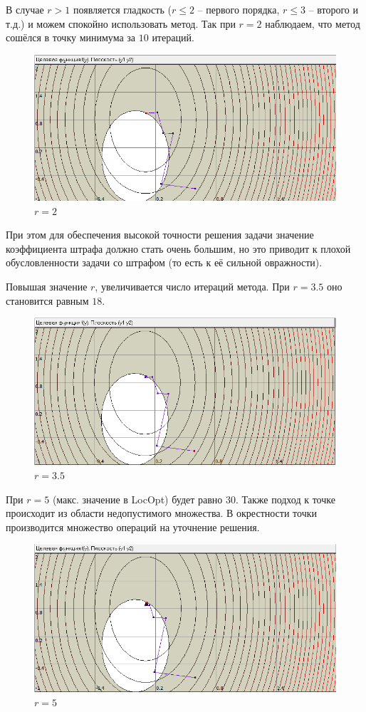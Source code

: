 В случае $ r > 1 $ появляется гладкость ($r \le 2$ -- первого порядка, $r \le 3$ -- второго и т.д.) и можем спокойно использовать метод. Так при $r = 2$ наблюдаем, что метод сошёлся в точку минимума за $10$ итераций.
\begin{figure}[H]
    \centering
    \includegraphics{2.png}
    \caption{$r = 2$}
\end{figure}

При этом для обеспечения высокой точности решения задачи значение коэффициента штрафа должно стать очень большим, но это приводит к плохой обусловленности задачи со штрафом (то есть к её сильной овражности).

Повышая значение $r$, увеличивается число итераций метода. При 
$r = 3.5$ оно становится равным $18$.
\begin{figure}[H]
    \centering
    \includegraphics{35.png}
    \caption{$r = 3.5$}
\end{figure}
При $r = 5$ (макс. значение в LocOpt) будет равно $30$.
Также подход к точке происходит из области недопустимого множества. В окрестности точки производится множество операций на уточнение решения.
\begin{figure}[H]
    \centering
    \includegraphics{5.png}
    \caption{$r = 5$}
\end{figure}

